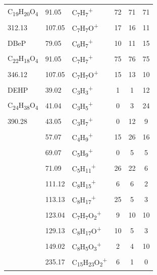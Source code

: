 {\begin{longtable}[c]{lllccc}
C\textsubscript{19}H\textsubscript{20}O\textsubscript{4}          & 91.05                & C\textsubscript{7}H\textsubscript{7}\textsuperscript{+}                           & 72           & 71           & 71           \\
312.13          & 107.05               & C\textsubscript{7}H\textsubscript{7}O\textsuperscript{+}                          & 17           & 16           & 11           \\
\hline
DBeP      & 79.05                & C\textsubscript{6}H\textsubscript{7}\textsuperscript{+}                           & 10           & 11           & 15           \\
C\textsubscript{22}H\textsubscript{18}O\textsubscript{4}          & 91.05                & C\textsubscript{7}H\textsubscript{7}\textsuperscript{+}                           & 75           & 76           & 75           \\
346.12          & 107.05               & C\textsubscript{7}H\textsubscript{7}O\textsuperscript{+}                          & 15           & 13           & 10          \\
\hline
DEHP  & 39.02  & C\textsubscript{3}H\textsubscript{3}\textsuperscript{+}                     & 1  & 1  & 12 \\
C\textsubscript{24}H\textsubscript{38}O\textsubscript{4}  & 41.04  & C\textsubscript{3}H\textsubscript{5}\textsuperscript{+}                     & 0  & 3  & 24 \\
390.28  & 43.05  & C\textsubscript{3}H\textsubscript{7}\textsuperscript{+}                     & 0  & 12 & 9  \\
 & 57.07  & C\textsubscript{4}H\textsubscript{9}\textsuperscript{+}                     & 15 & 26 & 16 \\
 & 69.07  & C\textsubscript{5}H\textsubscript{9}\textsuperscript{+}                     & 0  & 5  & 5  \\
 & 71.09  & C\textsubscript{5}H\textsubscript{11}\textsuperscript{+}                    & 26 & 22 & 6  \\
 & 111.12 & C\textsubscript{8}H\textsubscript{15}\textsuperscript{+}                    & 6  & 6  & 2  \\
 & 113.13 & C\textsubscript{8}H\textsubscript{17}\textsuperscript{+}                    & 25 & 5  & 3  \\
 & 123.04 & C\textsubscript{7}H\textsubscript{7}O\textsubscript{2}\textsuperscript{+}   & 9  & 10 & 10 \\
 & 129.13 & C\textsubscript{8}H\textsubscript{17}O\textsuperscript{+}                   & 10 & 5  & 3  \\
 & 149.02 & C\textsubscript{8}H\textsubscript{5}O\textsubscript{3}\textsuperscript{+}   & 2  & 4  & 10 \\
 & 235.17 & C\textsubscript{15}H\textsubscript{23}O\textsubscript{2}\textsuperscript{+} & 6  & 1  & 0  \\
\hline
\end{longtable}  

} %



